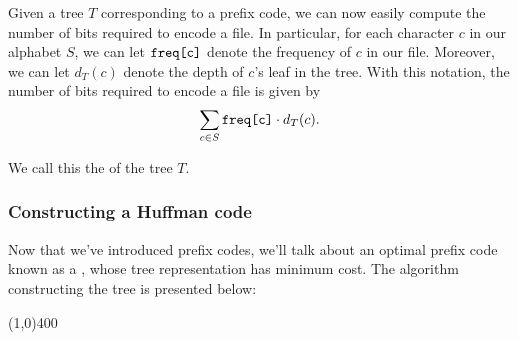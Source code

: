 Given a tree $T$ corresponding to a prefix code, we can now easily compute the number of bits required to encode a file. In particular, for each character $c$ in our alphabet $S$, we can let $\verb!freq[c]!$ denote the frequency of $c$ in our file. Moreover, we can let $d_{T}(c)$ denote the depth of $c$'s leaf in the tree. With this notation, the number of bits required to encode a file is given by 
\[
\sum_{c \in S} \verb!freq[c]! \cdot d_{T}(c).
\]

We call this the  of the tree $T$. 

\subsubsection{Constructing a Huffman code}

Now that we've introduced prefix codes, we'll talk about an optimal prefix code known as a , whose tree representation has minimum cost. The algorithm constructing the tree is presented below: \\

\newpage

\vspace{1em}
\begin{center}
\line(1,0){400}
\end{center}

